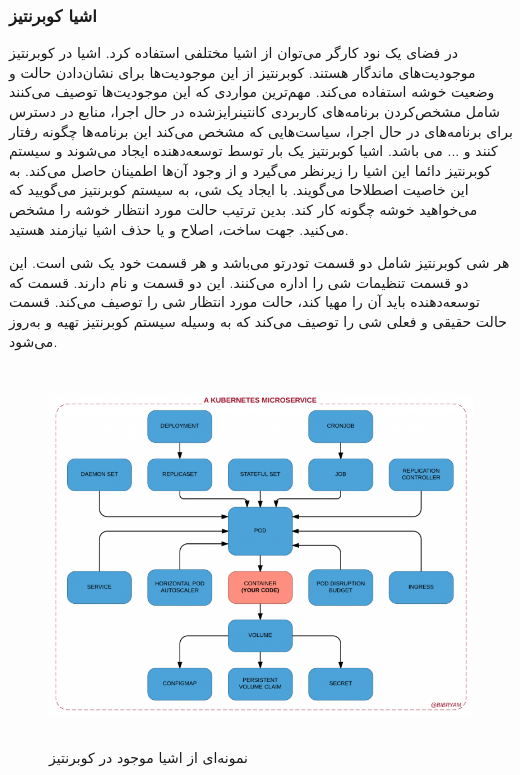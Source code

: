 \subsubsection{اشیا کوبرنتیز}

در فضای یک نود کارگر می‌توان از اشیا مختلفی استفاده کرد. اشیا در کوبرنتیز موجودیت‌های ماندگار هستند. کوبرنتیز از این موجودیت‌ها برای نشان‌دادن حالت و وضعیت خوشه استفاده می‌کند. مهم‌ترین مواردی که این موجودیت‌ها توصیف می‌کنند شامل مشخص‌کردن برنامه‌های کاربردی کانتینرایز‌شده در حال اجرا، منابع در دسترس برای برنامه‌های در حال اجرا، سیاست‌هایی که مشخص می‌کند این برنامه‌ها چگونه رفتار کنند و ... می باشد. اشیا کوبرنتیز یک بار توسط توسعه‌دهنده ایجاد می‌شوند و سیستم کوبرنتیز دائما این اشیا را زیرنظر می‌گیرد و از وجود آن‌ها اطمینان حاصل می‌کند. به این خاصیت اصطلاحا 
می‌گویند. با ایجاد یک شی، به سیستم کوبرنتیز می‌گویید که می‌خواهید خوشه چگونه کار کند. بدین ترتیب حالت مورد انتظار خوشه را مشخص می‌کنید. جهت ساخت، اصلاح و یا حذف اشیا نیازمند 
هستید.

هر شی کوبرنتیز شامل دو قسمت تو‌در‌تو می‌باشد و هر قسمت خود یک شی است. این دو قسمت تنظیمات شی را اداره می‌کنند. این دو قسمت 
و
نام دارند. قسمت 
که توسعه‌دهنده باید آن را مهیا کند، حالت مورد انتظار شی را توصیف می‌کند. قسمت 
حالت حقیقی و فعلی شی را توصیف می‌کند که به وسیله سیستم کوبرنتیز تهیه و به‌روز می‌شود.

\begin{figure}[!h]
	\centering
	\includegraphics[height=10cm,width=\linewidth]{fig2-13}
	\caption{نمونه‌ای از اشیا موجود در کوبرنتیز}
	\label{تصویر 2-13}
\end{figure}

